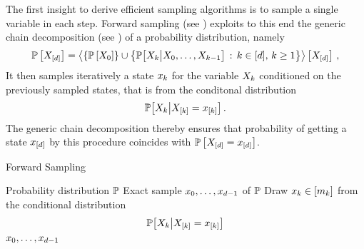 
The first insight to derive efficient sampling algorithms is to sample a single variable in each step.
Forward sampling (see ) exploits to this end the generic chain decomposition (see ) of a probability distribution, namely
\begin{align*}
    \mathbb{P}\left[X_{[d]}\right] = \left\langle \{\mathbb{P}\left[X_{0}\right]\} \cup
    \left\{\mathbb{P}\big[X_{k}\big|X_{0},\ldots,X_{k-1}\big]\,:\,k\in[d], \, k\geq 1\right\}
    \right\rangle \left[ X_{[d]} \right] \, ,
\end{align*}
It then samples iteratively a state $x_{k}$ for the variable $X_{k}$ conditioned on the previously sampled states, that is from the conditonal distribution
\begin{align*}
    \mathbb{P}\big[X_{k}\big|X_{[k]}=x_{[k]}\big] \, .
\end{align*}
The generic chain decomposition thereby ensures that probability of getting a state $x_{[d]}$ by this procedure coincides with $\mathbb{P}\left[X_{[d]}=x_{[d]}\right]$.

\begin{algorithm}[hbt!]
    \caption{Forward Sampling}\label{alg:ForwardSampling}
    \begin{algorithmic}
        \Require Probability distribution $\mathbb{P}$
        \Ensure Exact sample $x_{0},\ldots,x_{d-1}$ of $\mathbb{P}$
    \iosepline
        \ForAll{$\catenumeratorin$}
            \State Draw $x_{k}\in[m_{k}]$ from the conditional distribution
            \begin{align*}
                \mathbb{P}\big[X_{k}\big|X_{[k]}=x_{[k]}\big]
            \end{align*}
        \EndFor
        \State \Return $x_{0},\ldots,x_{d-1}$
    \end{algorithmic}
\end{algorithm}

